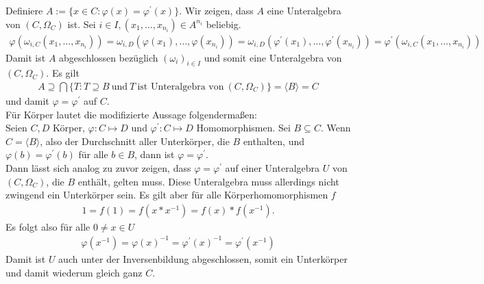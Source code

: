\begin{solution}
Definiere $A := \{x \in C: \varphi(x) = \varphi^{\prime}(x)\}$.
Wir zeigen, dass $A$ eine Unteralgebra von $(C,\Omega_C)$ ist.
Sei $i \in I, (x_1,\dots,x_{n_i}) \in A^{n_i}$ beliebig.
\begin{align*}
  \varphi(\omega_{i,C}(x_1,\dots,x_{n_i})) =
  \omega_{i,D}(\varphi(x_1),\dots,\varphi(x_{n_i})) =
  \omega_{i,D}(\varphi^{\prime}(x_1),\dots,\varphi^{\prime}(x_{n_i})) =
  \varphi^{\prime}(\omega_{i,C}(x_1,\dots,x_{n_i}))
\end{align*}
Damit ist $A$ abgeschlossen bezüglich $(\omega_i)_{i \in I}$ und somit eine
Unteralgebra von $(C,\Omega_C)$.
Es gilt
\begin{align*}
A \supseteq \bigcap\{T : T \supseteq B  ~\text{und}~ T
~\text{ist Unteralgebra von}~ (C,\Omega_C)\} = \langle B \rangle = C
\end{align*}
und damit $\varphi = \varphi^{\prime}$ auf $C$. \\
Für Körper lautet die modifizierte Aussage folgendermaßen: \\
Seien $C, D$ Körper, $\varphi: C \mapsto D$ und $\varphi^{\prime}: C \mapsto D$
Homomorphismen. Sei $B \subseteq C$. Wenn $C = \langle B \rangle$, also der
Durchschnitt aller Unterkörper, die $B$ enthalten, und
$\varphi(b) = \varphi^{\prime}(b)$ für alle $b \in B$, dann ist $\varphi =
\varphi^{\prime}$. \\
Dann lässt sich analog zu zuvor zeigen, dass $\varphi = \varphi^{\prime}$ auf
einer Unteralgebra $U$ von $(C,\Omega_C)$, die $B$ enthält, gelten muss. Diese Unteralgebra muss allerdings
nicht zwingend ein Unterkörper sein. Es gilt aber für
alle Körperhomomorphismen $f$
\begin{align*}
1 = f(1) = f(x*x^{-1}) = f(x)*f(x^{-1}).
\end{align*}
Es folgt also für alle $0 \neq x \in U$
\begin{align*}
  \varphi(x^{-1}) = \varphi(x)^{-1} = \varphi^{\prime}(x)^{-1} = \varphi^{\prime}(x^{-1})
\end{align*}
Damit ist $U$ auch unter der Inversenbildung abgeschlossen, somit ein Unterkörper
und damit wiederum gleich ganz $C$.
\end{solution}
